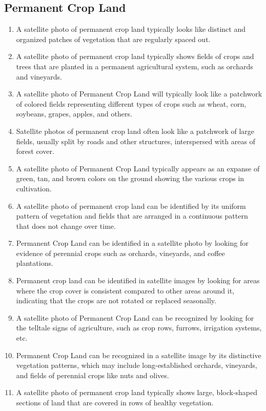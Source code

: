\documentclass[11pt]{article}
\begin{document}
\subsection{Permanent Crop Land}
\begin{enumerate}
\item A satellite photo of permanent crop land typically looks like distinct and organized patches of vegetation that are regularly spaced out.
\item A satellite photo of permanent crop land typically shows fields of crops and trees that are planted in a permanent agricultural system, such as orchards and vineyards.
\item A satellite photo of Permanent Crop Land will typically look like a patchwork of colored fields representing different types of crops such as wheat, corn, soybeans, grapes, apples, and others.
\item Satellite photos of permanent crop land often look like a patchwork of large fields, usually split by roads and other structures, interspersed with areas of forest cover.
\item A satellite photo of Permanent Crop Land typically appears as an expanse of green, tan, and brown colors on the ground showing the various crops in cultivation.
\item A satellite photo of permanent crop land can be identified by its uniform pattern of vegetation and fields that are arranged in a continuous pattern that does not change over time.
\item Permanent Crop Land can be identified in a satellite photo by looking for evidence of perennial crops such as orchards, vineyards, and coffee plantations.
\item Permanent crop land can be identified in satellite images by looking for areas where the crop cover is consistent compared to other areas around it, indicating that the crops are not rotated or replaced seasonally.
\item A satellite photo of Permanent Crop Land can be recognized by looking for the telltale signs of agriculture, such as crop rows, furrows, irrigation systems, etc.
\item Permanent Crop Land can be recognized in a satellite image by its distinctive vegetation patterns, which may include long-established orchards, vineyards, and fields of perennial crops like nuts and olives.
\item A satellite photo of permanent crop land typically shows large, block-shaped sections of land that are covered in rows of healthy vegetation.

\end{enumerate}
\end{document}
